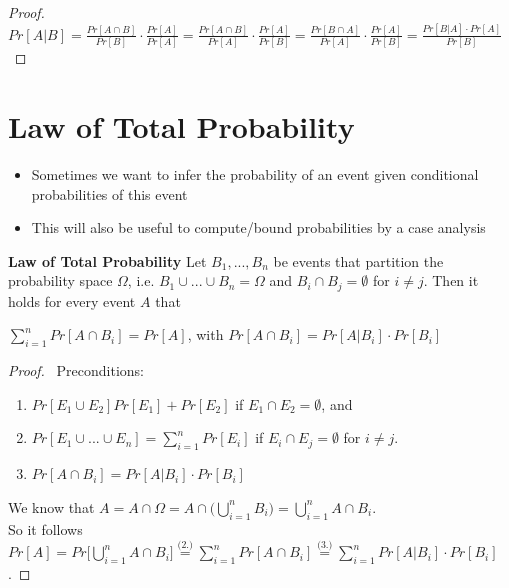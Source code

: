 		\begin{proof}
		$Pr[A|B] = \frac{Pr[A \cap B]}{Pr[B]} \cdot \frac{Pr[A]}{Pr[A]} = \frac{Pr[A \cap B]}{Pr[A]} \cdot \frac{Pr[A]}{Pr[B]} 
		= \frac{Pr[B \cap A]}{Pr[A]} \cdot \frac{Pr[A]}{Pr[B]} = \frac{Pr[B|A] \cdot Pr[A]}{Pr[B]}$
		\end{proof}
		
	\section{Law of Total Probability}
		\begin{itemize}
			\item Sometimes we want to infer the probability of an event given conditional probabilities of this event
			\item This will also be useful to compute/bound probabilities by a case analysis
		\end{itemize}
		\textbf{Law of Total Probability}\newline
		Let $B_1,...,B_n$ be events that partition the probability space $\Omega$, i.e. $B_1 \cup ... \cup B_n = \Omega$ and $B_i \cap B_j = \emptyset$ for $i \neq j$.
		Then it holds for every event $A$ that
		\begin{center}
			$\sum\limits_{i=1}^{n} Pr[A \cap B_i] = Pr[A]$, with $Pr[A \cap B_i] = Pr[A|B_i] \cdot Pr[B_i]$
		\end{center}
		
		\begin{proof}\ Preconditions:
			\begin{enumerate}
				\item $Pr[E_1 \cup E_2] Pr[E_1] + Pr[E_2]$ if $E_1 \cap E_2 = \emptyset$, and
				\item $Pr[E_1 \cup ... \cup E_n] = \sum\limits_{i=1}^{n} Pr[E_i]$ if $E_i \cap E_j = \emptyset$ for $i \neq j$.
				\item $Pr[A \cap B_i] = Pr[A|B_i] \cdot Pr[B_i]$
			\end{enumerate}
			We know that $A = A \cap \Omega = A \cap \Big( \bigcup\limits_{i=1}^{n} B_i \Big) = \bigcup\limits_{i=1}^{n} A \cap B_i$.\\
			So it follows $Pr[A] = Pr\Big[\bigcup\limits_{i=1}^{n} A \cap B_i\Big] \overset{\text{(2.)}}{=} \sum\limits_{i=1}^{n} Pr[A \cap B_i] 
			\overset{\text{(3.)}}{=} \sum\limits_{i=1}^{n} Pr[A | B_i]\cdot Pr[B_i]$.
		\end{proof}
		
